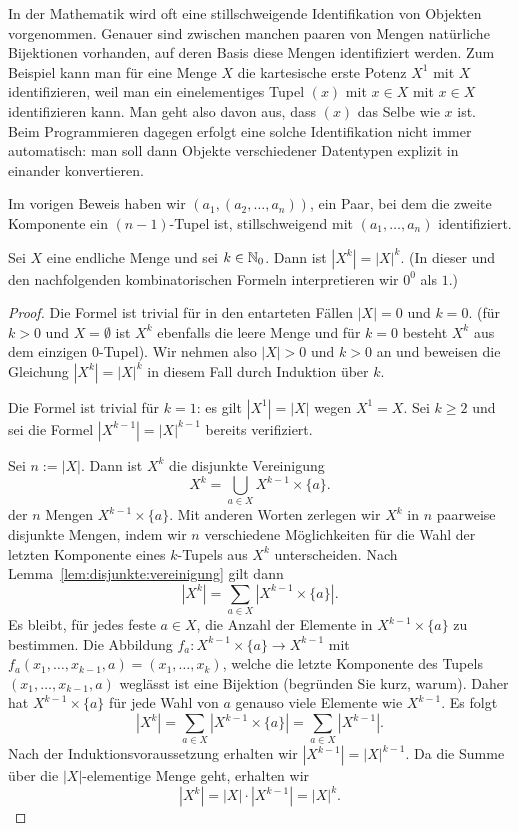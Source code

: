 \begin{bem}
	In der Mathematik wird oft eine stillschweigende Identifikation von Objekten vorgenommen. Genauer sind  zwischen manchen paaren von Mengen natürliche Bijektionen vorhanden, auf deren Basis diese Mengen identifiziert werden. Zum Beispiel kann man für eine Menge $X$ die kartesische erste Potenz $X^1$ mit $X$ identifizieren, weil man ein einelementiges Tupel $(x)$ mit $x \in X$ mit $x \in X$ identifizieren kann. Man geht also davon aus, dass $(x)$ das Selbe wie $x$ ist. Beim Programmieren dagegen erfolgt eine solche Identifikation nicht immer automatisch: man soll dann Objekte verschiedener Datentypen explizit in einander konvertieren. 
	
	Im vorigen Beweis haben wir $(a_1,(a_2,\ldots,a_n))$, ein Paar, bei dem die zweite Komponente ein $(n-1)$-Tupel ist, stillschweigend mit $(a_1,\ldots,a_n)$ identifiziert. 
\end{bem} 

\begin{thm}
	Sei $X$ eine endliche Menge und sei $k \in \mathbb{N}_0$. Dann ist $|X^k| = |X|^k$. (In dieser und den nachfolgenden kombinatorischen Formeln interpretieren wir $0^0$ als $1$.)
\end{thm} 
\begin{proof} 
	Die Formel ist trivial für in den entarteten Fällen $|X|=0$ und $k=0$.
	(für $k>0$ und $X = \emptyset$ ist $X^k$ ebenfalls die leere Menge und für $k=0$  besteht $X^k$ aus dem einzigen $0$-Tupel).  Wir nehmen also $|X| >0$ und $k>0$ an und beweisen  die Gleichung $|X^k| = |X|^k$  in diesem Fall durch Induktion über $k$. 
	
	Die Formel ist trivial für $k = 1$: es gilt $|X^1| = |X|$ wegen $X^1 = X$. Sei $k \ge 2$ und sei die Formel $|X^{k-1}| = |X|^{k-1}$ bereits verifiziert. 
	
	Sei $n:=|X|$. Dann ist $X^k$ die disjunkte Vereinigung 
	\[
			X^k = \bigcup_{a \in X} X^{k-1} \times \{a\}. 
	\]
	der $n$ Mengen $X^{k-1} \times \{a\}$. Mit anderen Worten zerlegen wir $X^k$ in $n$ paarweise disjunkte Mengen, indem wir $n$ verschiedene Möglichkeiten für die Wahl der letzten Komponente eines $k$-Tupels aus $X^k$ unterscheiden. Nach Lemma~\ref{lem:disjunkte:vereinigung} gilt dann 
	\[
			|X^k| = \sum_{a \in X} |X^{k-1} \times \{a\}|. 
	\]
	Es bleibt, für jedes feste $a \in X$, die Anzahl der Elemente in $X^{k-1} \times \{a\}$ zu bestimmen. Die Abbildung 
	$f_a : X^{k-1} \times \{a\} \to X^{k-1}$ mit $f_a(x_1,\ldots,x_{k-1},a) = (x_1,\ldots,x_k)$, welche die letzte Komponente des Tupels $(x_1,\ldots,x_{k-1},a)$ weglässt ist eine Bijektion (begründen Sie kurz, warum). Daher hat $X^{k-1} \times \{a\}$ für jede Wahl von $a$ genauso viele Elemente wie $X^{k-1}$. Es folgt 
	\[
			|X^k| = \sum_{a \in X} |X^{k-1} \times \{a\}| = \sum_{a \in X} |X^{k-1}|. 
	\]
	Nach der Induktionsvoraussetzung erhalten wir $|X^{k-1}| = |X|^{k-1}$. Da die Summe über die $|X|$-elementige Menge geht, erhalten wir 
	\[
			|X^k| = |X| \cdot |X^{k-1}| = |X|^k. 
	\]
\end{proof} 


